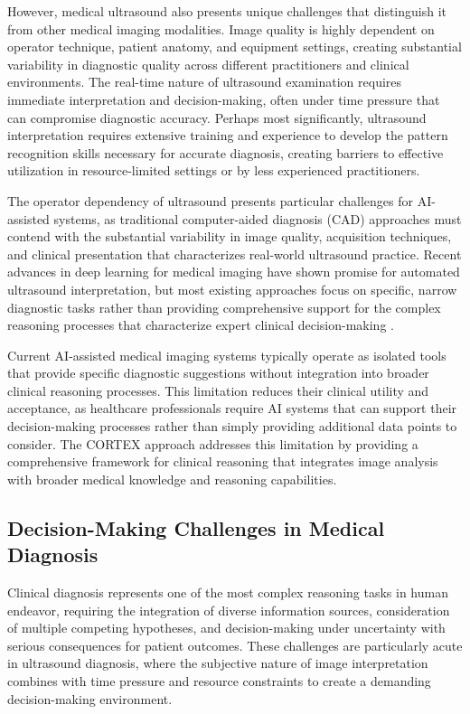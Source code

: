 However, medical ultrasound also presents unique challenges that distinguish it from other medical imaging modalities. Image quality is highly dependent on operator technique, patient anatomy, and equipment settings, creating substantial variability in diagnostic quality across different practitioners and clinical environments. The real-time nature of ultrasound examination requires immediate interpretation and decision-making, often under time pressure that can compromise diagnostic accuracy. Perhaps most significantly, ultrasound interpretation requires extensive training and experience to develop the pattern recognition skills necessary for accurate diagnosis, creating barriers to effective utilization in resource-limited settings or by less experienced practitioners.

The operator dependency of ultrasound presents particular challenges for AI-assisted systems, as traditional computer-aided diagnosis (CAD) approaches must contend with the substantial variability in image quality, acquisition techniques, and clinical presentation that characterizes real-world ultrasound practice. Recent advances in deep learning for medical imaging have shown promise for automated ultrasound interpretation, but most existing approaches focus on specific, narrow diagnostic tasks rather than providing comprehensive support for the complex reasoning processes that characterize expert clinical decision-making \cite{van2019deep}.

Current AI-assisted medical imaging systems typically operate as isolated tools that provide specific diagnostic suggestions without integration into broader clinical reasoning processes. This limitation reduces their clinical utility and acceptance, as healthcare professionals require AI systems that can support their decision-making processes rather than simply providing additional data points to consider. The CORTEX approach addresses this limitation by providing a comprehensive framework for clinical reasoning that integrates image analysis with broader medical knowledge and reasoning capabilities.

\subsection{Decision-Making Challenges in Medical Diagnosis}

Clinical diagnosis represents one of the most complex reasoning tasks in human endeavor, requiring the integration of diverse information sources, consideration of multiple competing hypotheses, and decision-making under uncertainty with serious consequences for patient outcomes. These challenges are particularly acute in ultrasound diagnosis, where the subjective nature of image interpretation combines with time pressure and resource constraints to create a demanding decision-making environment.

